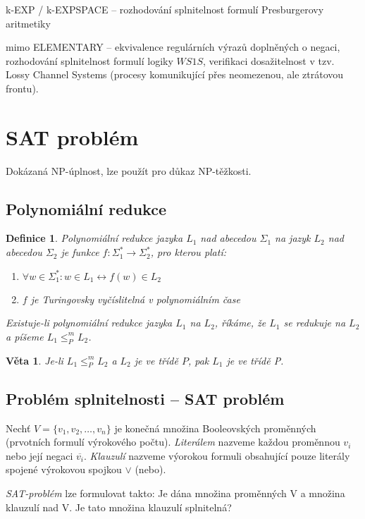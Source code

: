 \documentclass[a4paper, 11pt]{report}
\newtheorem{mydef}{Definice}[chapter]
\newtheorem{veta}{Věta}[chapter]
\begin{document}
k-EXP / k-EXPSPACE -- rozhodování splnitelnost formulí Presburgerovy aritmetiky

mimo ELEMENTARY -- ekvivalence regulárních výrazů doplněných o negaci, rozhodování splnitelnost formulí logiky $WS1S$, verifikaci dosažitelnost v tzv. Lossy Channel Systems (procesy komunikující přes neomezenou, ale ztrátovou frontu).

\section{SAT problém}
Dokázaná NP-úplnost, lze použít pro důkaz NP-těžkosti.

\subsection{Polynomiální redukce}

\begin{mydef}
Polynomiální redukce jazyka $L_1$ nad abecedou $\Sigma_1$ na jazyk $L_2$ nad abecedou $\Sigma_2$ je funkce $f: \Sigma_1^* \to \Sigma_2^*$, pro kterou platí:
\begin{enumerate}
	\item $\forall w \in \Sigma_1^* : w \in L_1 \leftrightarrow f(w) \in L_2$
	\item $f$ je Turingovsky vyčíslitelná v polynomiálním čase
\end{enumerate}
Existuje-li polynomiální redukce jazyka $L_1$ na $L_2$, říkáme, že $L_1$ se redukuje na $L_2$ a píšeme $L_1 \leq _P^m L_2$.
\end{mydef}

\begin{veta}
Je-li $L_1 \leq_P^m L_2$ a $L_2$ je ve třídě $P$, pak $L_1$ je ve třídě P.
\end{veta}

\subsection{Problém splnitelnosti -- SAT problém}
Nechť $V = \{v_1, v_2, \dots, v_n\}$ je konečná množina Booleovských proměnných (prvotních formulí výrokového počtu). \emph{Literálem} nazveme každou proměnnou $v_i$ nebo její negaci $\overline{v_i}$. 
\emph{Klauzulí} nazveme výorokou formuli obsahující pouze literály spojené výrokovou spojkou $\lor$ (nebo).

\emph{SAT-problém} lze formulovat takto: Je dána množina proměnných V a množina klauzulí nad V. Je tato množina klauzulí splnitelná?
\end{document}
